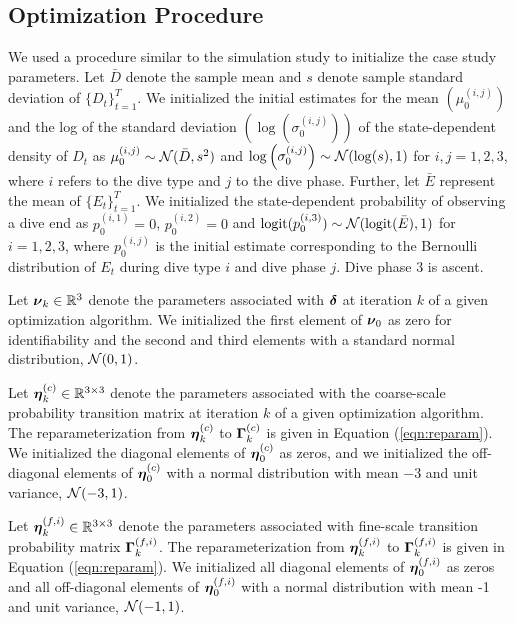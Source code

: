 \subsection{Optimization Procedure}

We used a procedure similar to the simulation study to initialize the case study parameters. Let $\bar D$ denote the sample mean and $s$ denote sample standard deviation of $\{D_t\}_{t=1}^T$. We initialized the initial estimates for the mean $\left(\mu^{(i,j)}_0\right)$ and the log of the standard deviation $\left(\log\left(\sigma^{(i,j)}_0\right)\right)$ of the state-dependent density of $D_t$ as $\mu^{(i,j)}_0 \sim \mathcal{N}(\bar D, s^2)$ and $\log\left(\sigma^{(i,j)}_0\right) \sim \mathcal{N}(\log(s),1)$ for $i,j = 1,2,3$, where $i$ refers to the dive type and $j$ to the dive phase. Further, let $\bar E$ represent the mean of $\{E_t\}_{t=1}^T$. We initialized the state-dependent probability of observing a dive end as $p^{(i,1)}_0 = 0$, $p^{(i,2)}_0 = 0$ and $\operatorname*{logit}(p^{(i,3)}_0) \sim \mathcal{N}(\operatorname*{logit}(\bar E),1)$ for $i = 1,2,3$, where $p^{(i,j)}_0$ is the initial estimate corresponding to the Bernoulli distribution of $E_t$ during dive type $i$ and dive phase $j$. Dive phase 3 is ascent.

Let $\boldsymbol{\nu}_k \in \mathbb{R}^3$ denote the parameters associated with $\boldsymbol{\delta}$ at iteration $k$ of a given optimization algorithm. We initialized the first element of $\boldsymbol{\nu}_0$ as zero for identifiability and the second and third elements with a standard normal distribution, $\mathcal{N}(0,1)$.

Let $\boldsymbol{\eta}_k^{(c)} \in \mathbb{R}^{3 \times 3}$ denote the parameters associated with the coarse-scale probability transition matrix at iteration $k$ of a given optimization algorithm. The reparameterization from $\boldsymbol{\eta}_k^{(c)}$ to $\boldsymbol{\Gamma}_k^{(c)}$ is given in Equation (\ref{eqn:reparam}). We initialized the diagonal elements of $\boldsymbol{\eta}_0^{(c)}$ as zeros, and we initialized the off-diagonal elements of $\boldsymbol{\eta}_0^{(c)}$ with a normal distribution with mean $-3$ and unit variance, $\mathcal{N}(-3,1)$.

Let $\boldsymbol{\eta}_k^{(f,i)} \in \mathbb{R}^{3 \times 3}$ denote the parameters associated with fine-scale transition probability matrix $\boldsymbol{\Gamma}_k^{(f,i)}$. The reparameterization from $\boldsymbol{\eta}_k^{(f,i)}$ to $\boldsymbol{\Gamma}_k^{(f,i)}$ is given in Equation (\ref{eqn:reparam}). We initialized all diagonal elements of $\boldsymbol{\eta}_0^{(f,i)}$ as zeros and all off-diagonal elements of $\boldsymbol{\eta}_0^{(f,i)}$ with a normal distribution with mean -1 and unit variance, $\mathcal{N}(-1,1)$.

